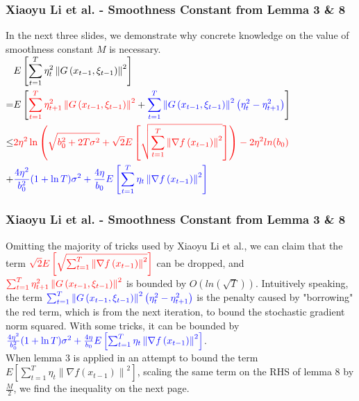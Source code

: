 \documentclass{beamer}
\begin{document}
\begin{frame}
\frametitle{Xiaoyu Li et al. - Smoothness Constant from Lemma 3 \& 8} 
In the next three slides, we demonstrate why concrete knowledge on the value of smoothness constant $M$ is necessary.
$\begin{aligned} & E\left[\sum_{t=1}^T \eta_t^2\left\|G\left(x_{t-1}, \xi_{t-1}\right)\right\|^2\right]\\ =&E\left[\color{red}\sum_{t=1}^T \eta_{t+1}^2\left\|G\left(x_{t-1}, \xi_{t-1}\right)\right\|^2\color{black}+\color{blue}\sum_{t=1}^T\left\|G\left(x_{t-1}, \xi_{t-1}\right)\right\|^2\left(\eta_t^2-\eta_{t+1}^2\right)\color{black}\right] \\  \leq & \color{red}2 \eta^2 \ln \left(\sqrt{b_0^2+2 T \sigma^2}+\sqrt{2} E\left[\sqrt{\sum_{t=1}^T\left\|\nabla f\left(x_{t-1}\right)\right\|^2}\right]\right) - 2\eta^2 ln(b_0)\\ \color{black}+ &\color{blue}\frac{4 \eta^2}{b_0^2}(1+\ln T) \sigma^2+\frac{4 \eta}{b_0} E\left[\sum_{t=1}^T \eta_t\left\|\nabla f\left(x_{t-1}\right)\right\|^2\right]\end{aligned}$

\end{frame}

\begin{frame}
\frametitle{Xiaoyu Li et al. - Smoothness Constant from Lemma 3 \& 8} 
Omitting the majority of tricks used by Xiaoyu Li et al., we can claim that the term $\color{red}\sqrt{2} E\left[\sqrt{\sum_{t=1}^T\left\|\nabla f\left(x_{t-1}\right)\right\|^2}\right]$ can be dropped, and $\color{red}\sum_{t=1}^T \eta_{t+1}^2\left\|G\left(x_{t-1}, \xi_{t-1}\right)\right\|^2$ is bounded by $O(ln(\sqrt{T}))$.
Intuitively speaking, the term $\color{blue}\sum_{t=1}^T\left\|G\left(x_{t-1}, \xi_{t-1}\right)\right\|^2\left(\eta_t^2-\eta_{t+1}^2\right)$ is the penalty caused by "borrowing" the red term, which is from the next iteration, to bound the stochastic gradient norm squared. With some tricks, it can be bounded by $\color{blue}\frac{4 \eta^2}{b_0^2}(1+\ln T) \sigma^2+\frac{4 \eta}{b_0} E\left[\sum_{t=1}^T \eta_t\left\|\nabla f\left(x_{t-1}\right)\right\|^2\right]$.\\
When lemma 3 is applied in an attempt to bound the term $E\left[\sum_{t=1}^T \eta_t\left\|\nabla f\left(x_{t-1}\right)\right\|^2\right]$, scaling the same term on the RHS of lemma 8 by $\frac{M}{2}$, we find the inequality on the next page.
\end{frame}
\end{document}
